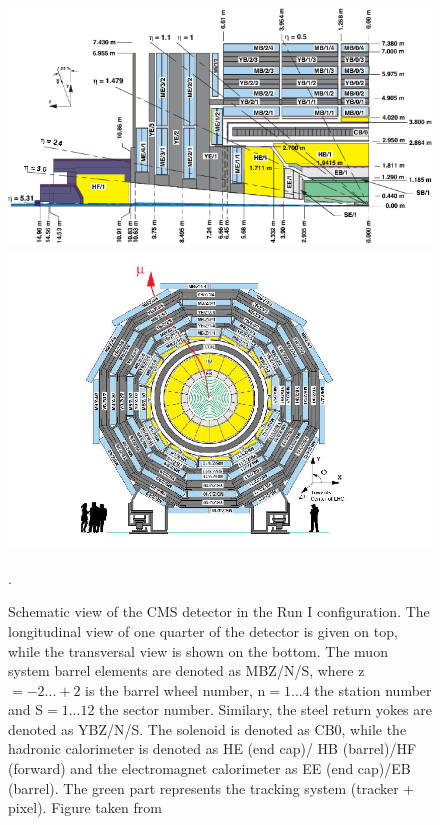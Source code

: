 \begin{figure}[htbp]
	\centering
	\includegraphics[width=1.\linewidth]{2_ExperimentalSetup/Figures/cmsview1}
	\includegraphics[width=1.\linewidth]{2_ExperimentalSetup/Figures/cmsview}
 \caption{Schematic view of the CMS detector in the Run I configuration. The longitudinal view of one quarter of the detector is given on top, while the transversal view is shown on the bottom. The muon system barrel elements are denoted as MBZ/N/S, where z$=-2...+2$ is the barrel wheel number, n$=1...4$ the station number and S$=1...12$ the sector number. Similary, the steel return yokes are denoted as YBZ/N/S. The solenoid is denoted as CB0, while the hadronic calorimeter is denoted as HE (end cap)/ HB (barrel)/HF (forward) and the electromagnet calorimeter as EE (end cap)/EB (barrel). The green part represents the tracking system (tracker + pixel). Figure taken from~\cite{Chatrchyan:1223944}}.
	\label{fig:CMSview}
\end{figure}

